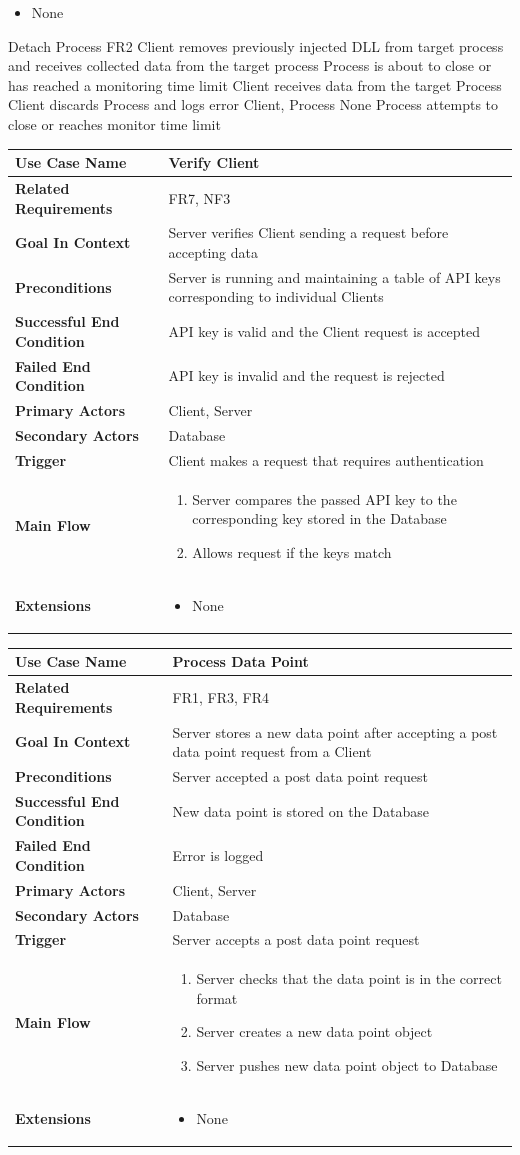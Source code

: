 \documentclass[titlepage]{article}
\newcommand{\longUseCase}[3]
{
    \def\tempMainFlow{#1}%
    \def\tempExtension{#2}%
    \usecase#3
}
\newcommand{\usecase}[9]
{
    \begin{table}[H]
        \centering
        \begin{tabularx}{\textwidth}{|X | X|}
        \hline
            \textbf{Use Case Name} & #1\\
        \hline
            \textbf{Related Requirements} & #2\\
        \hline
            \textbf{Goal In Context} & #3\\
        \hline
            \textbf{Preconditions} & #4\\
        \hline
            \textbf{Successful End Condition} & #5\\
        \hline
            \textbf{Failed End Condition} & #6\\
        \hline
            \textbf{Primary Actors} & #7\\
        \hline
            \textbf{Secondary Actors} & #8\\
        \hline
            \textbf{Trigger} & #9\\
        \hline
            \textbf{Main Flow} & \tempMainFlow\\
        \hline
            \textbf{Extensions} & \tempExtension\\
        \hline
        \end{tabularx}
    \end{table}
    
}
\begin{document}
{
\begin{itemize}
    \item None
\end{itemize}
}
{
{Detach Process}
{FR2}
{Client removes previously injected DLL from target process and receives collected data from the target process}
{Process is about to close or has reached a monitoring time limit}
{Client receives data from the target Process}
{Client discards Process and logs error}
{Client, Process}
{None}
{Process attempts to close or reaches monitor time limit}
}
\longUseCase
{
\begin{enumerate}
    \item Server compares the passed API key to the corresponding key stored in the Database
    \item Allows request if the keys match
\end{enumerate}
}
{
\begin{itemize}
    \item None
\end{itemize}
}
{
{Verify Client}
{FR7, NF3}
{Server verifies Client sending a request before accepting data}
{Server is running and maintaining a table of API keys corresponding to individual Clients}
{API key is valid and the Client request is accepted}
{API key is invalid and the request is rejected}
{Client, Server}
{Database}
{Client makes a request that requires authentication}
}
\longUseCase
{
\begin{enumerate}
    \item Server checks that the data point is in the correct format
    \item Server creates a new data point object
    \item Server pushes new data point object to Database
\end{enumerate}
}
{
\begin{itemize}
    \item None
\end{itemize}
}
{
{Process Data Point}
{FR1, FR3, FR4}
{Server stores a new data point after accepting a post data point request from a Client}
{Server accepted a post data point request}
{New data point is stored on the Database}
{Error is logged}
{Client, Server}
{Database}
{Server accepts a post data point request}
}
\end{document}
